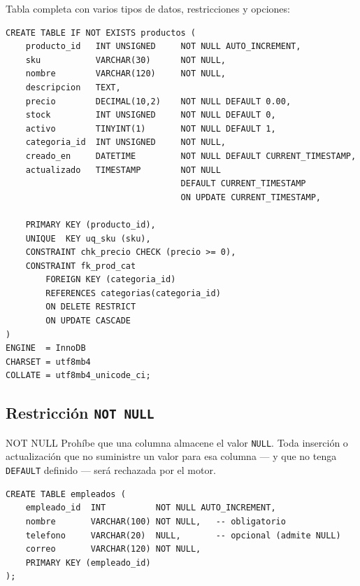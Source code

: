 \begin{ejemplo}
  Tabla completa con varios tipos de datos, restricciones y opciones:

\begin{lstlisting}[style=sql, caption={CREATE TABLE con opciones reales de producción}]
CREATE TABLE IF NOT EXISTS productos (
    producto_id   INT UNSIGNED     NOT NULL AUTO_INCREMENT,
    sku           VARCHAR(30)      NOT NULL,
    nombre        VARCHAR(120)     NOT NULL,
    descripcion   TEXT,
    precio        DECIMAL(10,2)    NOT NULL DEFAULT 0.00,
    stock         INT UNSIGNED     NOT NULL DEFAULT 0,
    activo        TINYINT(1)       NOT NULL DEFAULT 1,
    categoria_id  INT UNSIGNED     NOT NULL,
    creado_en     DATETIME         NOT NULL DEFAULT CURRENT_TIMESTAMP,
    actualizado   TIMESTAMP        NOT NULL
                                   DEFAULT CURRENT_TIMESTAMP
                                   ON UPDATE CURRENT_TIMESTAMP,

    PRIMARY KEY (producto_id),
    UNIQUE  KEY uq_sku (sku),
    CONSTRAINT chk_precio CHECK (precio >= 0),
    CONSTRAINT fk_prod_cat
        FOREIGN KEY (categoria_id)
        REFERENCES categorias(categoria_id)
        ON DELETE RESTRICT
        ON UPDATE CASCADE
)
ENGINE  = InnoDB
CHARSET = utf8mb4
COLLATE = utf8mb4_unicode_ci;
\end{lstlisting}
\end{ejemplo}

\subsection{Restricción \texttt{NOT NULL}}

\begin{definicion}{NOT NULL}
  Prohíbe que una columna almacene el valor \texttt{NULL}. Toda inserción o
  actualización que no suministre un valor para esa columna — y que no tenga
  \texttt{DEFAULT} definido — será rechazada por el motor.
\end{definicion}

\begin{lstlisting}[style=sql, caption={Columnas con y sin NOT NULL}]
CREATE TABLE empleados (
    empleado_id  INT          NOT NULL AUTO_INCREMENT,
    nombre       VARCHAR(100) NOT NULL,   -- obligatorio
    telefono     VARCHAR(20)  NULL,       -- opcional (admite NULL)
    correo       VARCHAR(120) NOT NULL,
    PRIMARY KEY (empleado_id)
);
\end{lstlisting}

